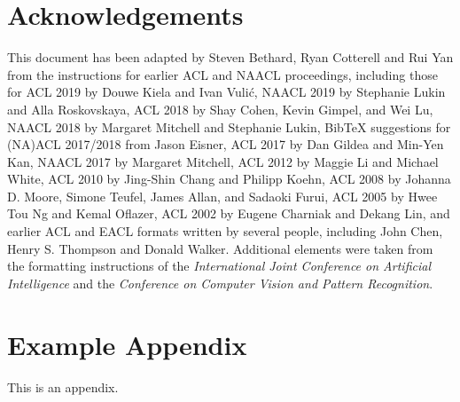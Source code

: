 \documentclass[11pt]{article}
\begin{document}
\section*{Acknowledgements}

This document has been adapted
by Steven Bethard, Ryan Cotterell and Rui Yan
from the instructions for earlier ACL and NAACL proceedings, including those for
ACL 2019 by Douwe Kiela and Ivan Vuli\'{c},
NAACL 2019 by Stephanie Lukin and Alla Roskovskaya,
ACL 2018 by Shay Cohen, Kevin Gimpel, and Wei Lu,
NAACL 2018 by Margaret Mitchell and Stephanie Lukin,
Bib\TeX{} suggestions for (NA)ACL 2017/2018 from Jason Eisner,
ACL 2017 by Dan Gildea and Min-Yen Kan,
NAACL 2017 by Margaret Mitchell,
ACL 2012 by Maggie Li and Michael White,
ACL 2010 by Jing-Shin Chang and Philipp Koehn,
ACL 2008 by Johanna D. Moore, Simone Teufel, James Allan, and Sadaoki Furui,
ACL 2005 by Hwee Tou Ng and Kemal Oflazer,
ACL 2002 by Eugene Charniak and Dekang Lin,
and earlier ACL and EACL formats written by several people, including
John Chen, Henry S. Thompson and Donald Walker.
Additional elements were taken from the formatting instructions of the \emph{International Joint Conference on Artificial Intelligence} and the \emph{Conference on Computer Vision and Pattern Recognition}.




\appendix

\section{Example Appendix}
\label{sec:appendix}

This is an appendix.
\end{document}
